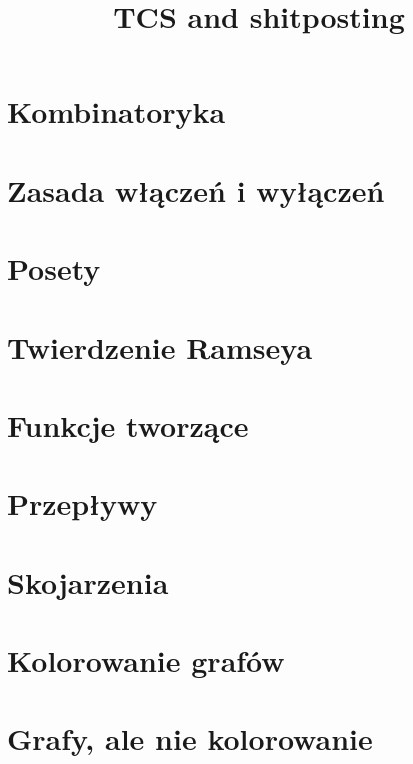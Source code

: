 \documentclass[12pt, a4paper, polish, openany]{book}
\author{
}
\title{TCS and shitposting}
\begin{document}
\frontmatter



\tableofcontents


\mainmatter

\chapter{Kombinatoryka}


\chapter{Zasada włączeń i wyłączeń}


\chapter{Posety}


\chapter{Twierdzenie Ramseya}


\chapter{Funkcje tworzące}


\chapter{Przepływy}


\chapter{Skojarzenia}


\chapter{Kolorowanie grafów}


\chapter{Grafy, ale nie kolorowanie}

\end{document}
